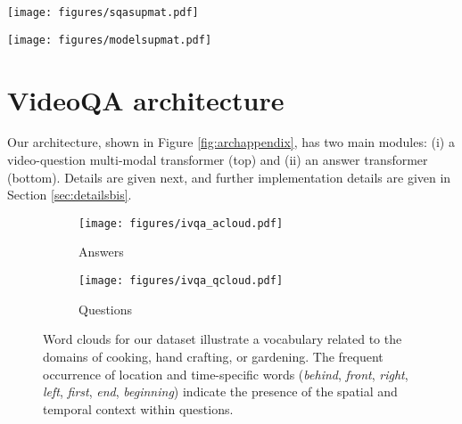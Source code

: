 \begin{figure*}[t]
\centering
\texttt{[image: figures/sqasupmat.pdf]}
\caption{Additional examples of videos, questions and answers from our automatically generated \datasetname{} dataset. These examples illustrate the large data diversity in \datasetname{}. {\color{green}The green color} indicates relevant examples, {\color{orange}the orange color} (penultimate row) indicates a failure of the question-answer generation, and {\color{red}the red color} (last row) indicates that the generated question-answer is unrelated to the visual content.}
\label{fig:sqa_add}
\end{figure*}

\begin{figure*}[t]
\centering
\texttt{[image: figures/modelsupmat.pdf]}
\vspace{-0.2cm}
\caption{{\bf VideoQA architecture overview.} Our model is composed of a video-question module $f$ based on a multi-modal transformer (top) and an answer module $g$ based on DistilBERT \cite{sanh2019distilbert} encoder (bottom).}
\vspace{-0.5cm}
\label{fig:archappendix}
\end{figure*}



\section{VideoQA architecture}\label{sec:mmt}
Our architecture, shown in Figure \ref{fig:archappendix}, has two main modules: (i) a video-question multi-modal transformer (top) and (ii) an answer transformer (bottom). Details are given next, and further implementation details are given in Section \ref{sec:detailsbis}.

\begin{figure}[t]
\centering
\begin{subfigure}{.5\textwidth}
\texttt{[image: figures/ivqa\_acloud.pdf]}
\caption{Answers}
\end{subfigure}
\begin{subfigure}{.5\textwidth}
\texttt{[image: figures/ivqa\_qcloud.pdf]}
\caption{Questions}
\end{subfigure}
\vspace{-0.31cm}
\caption{Word clouds for our \smalldatasetname{} dataset illustrate a vocabulary related to the domains of cooking, hand crafting, or gardening. The frequent  occurrence of location and time-specific words (\textit{behind}, \textit{front}, \textit{right}, \textit{left}, \textit{first}, \textit{end}, \textit{beginning}) indicate the presence of the spatial and temporal context within \smalldatasetname{} questions.}
\vspace{-0.6cm}
\label{fig:words}
\end{figure}

